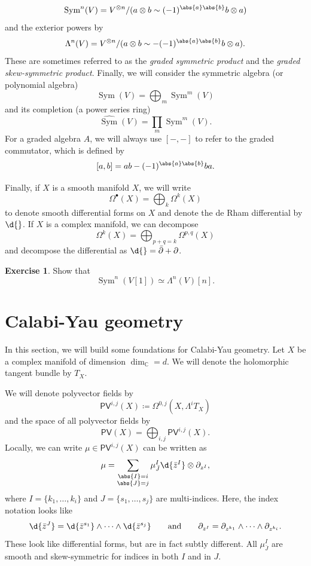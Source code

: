 \documentclass{amsart}
\theoremstyle{definition}
\newtheorem{exer}[thm]{Exercise}
\theoremstyle{remark}
\theoremstyle{plain}
\theoremstyle{definition}
\theoremstyle{remark}
\newcommand{\C}{\mathbb{C}}
\newcommand{\on}[1]{\operatorname{#1}}
\newcommand{\ms}[1]{\mathsf{#1}}
\newcommand{\wh}[1]{\widehat{#1}}
\newcommand{\1}{\mathbf{1}}
\newcommand{\2}{\mathbf{2}}
\newcommand{\3}{\mathbf{3}}
\DeclareMathOperator{\Sym}{Sym}
\begin{document}
    \[ \on{Sym}^n(V) = V^{\otimes n} / (a \otimes b \sim (-1)^{\abs{a} \abs{b}} b \otimes a) \]
    and the exterior powers by
    \[ \Lambda^n (V) = V^{\otimes n} / (a \otimes b \sim -(-1)^{\abs{a} \abs{b}} b \otimes a). \]
    These are sometimes referred to as the \textit{graded symmetric product} and the \textit{graded skew-symmetric product}. Finally, we will consider the symmetric algebra (or polynomial algebra)
    \[ \Sym(V) = \bigoplus_m \Sym^m(V) \]
    and its completion (a power series ring)
    \[ \wh{\Sym}(V) = \prod_{m} \Sym^m(V). \]
    For a graded algebra \(A\), we will always use \([-,-]\) to refer to the graded commutator, which is defined by
    \[ [a,b] = ab - (-1)^{\abs{a} \abs{b}} ba. \]
    
    Finally, if \(X\) is a smooth manifold \(X\), we will write
    \[ \Omega^{\bullet}(X) = \bigoplus_k \Omega^k (X) \]
    to denote smooth differential forms on \(X\) and denote the de Rham differential by \(\d{}\). If \(X\) is a complex manifold, we can decompose
    \[ \Omega^k(X) = \bigoplus_{p+q=k} \Omega^{p,q}(X) \]
    and decompose the differential as \(\d{} = \bar{\partial} + \partial\).


\begin{exer}
    Show that
    \[ \on{Sym}^n(V[1]) \simeq \Lambda^n(V)[n]. \]
\end{exer}

\section{Calabi-Yau geometry}%
\label{sec:Calabi-Yau geometry}

In this section, we will build some foundations for Calabi-Yau geometry. Let \(X\) be a complex manifold of dimension \(\dim_{\C} = d\). We will denote the holomorphic tangent bundle by \(T_X\). 

We will denote polyvector fields by
\[ \ms{PV}^{i,j}(X) \coloneqq \Omega^{0, j}(X, \Lambda^i T_X) \]
and the space of all polyvector fields by
\[ \ms{PV}(X) = \bigoplus_{i,j} \ms{PV}^{i,j}(X). \]
Locally, we can write \(\mu \in \ms{PV}^{i,j}(X)\) can be written as
\[ \mu = \sum_{\substack{\abs{I} = i \\ \abs{J} = j}} \mu^I_{\bar{J}} \d{\bar{z}^I} \otimes \partial_{z^I}, \]
where \(I = \{k_1, \ldots, k_i \}\) and \(J = \{ s_1, \ldots, s_j\}\) are multi-indices. Here, the index notation looks like
\[ \d{\bar{z}^J} = \d{\bar{z}^{s_1}} \wedge \cdots \wedge \d{\bar{z}^{s_j}} \qquad \text{and} \qquad \partial_{z^I} = \partial_{z^{k_1}} \wedge \cdots \wedge \partial_{z^{k_i}}. \]
These look like differential forms, but are in fact subtly different. All \(\mu^I_{\bar{J}}\) are smooth and skew-symmetric for indices in both \(I\) and in \(J\).
\end{document}
